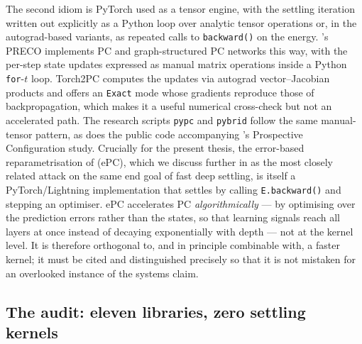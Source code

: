 The second idiom is PyTorch used as a tensor engine, with the settling iteration written
out explicitly as a Python loop over analytic tensor operations or, in the autograd-based
variants, as repeated calls to \texttt{backward()} on the energy. \citet{vanzwol2024preco}'s
PRECO implements PC and graph-structured PC networks this way, with the per-step state
updates expressed as manual matrix operations inside a Python \texttt{for}-$t$ loop.
Torch2PC \citep{vanzwol2024preco} computes the updates via autograd vector--Jacobian
products and offers an \texttt{Exact} mode whose gradients reproduce those of
backpropagation, which makes it a useful numerical cross-check but not an accelerated path.
The research scripts \texttt{pypc} and \texttt{pybrid} follow the same manual-tensor
pattern, as does the public code accompanying \citet{song2024prospective}'s Prospective
Configuration study. Crucially for the present thesis, the error-based reparametrisation of
\citet{goemaere2025epc} (ePC), which we discuss further in
 as the most closely related attack on the same end goal
of fast deep settling, is itself a PyTorch/Lightning implementation that settles by
calling \texttt{E.backward()} and stepping an optimiser. ePC accelerates PC
\emph{algorithmically} --- by optimising over the prediction errors rather than the states,
so that learning signals reach all layers at once instead of decaying exponentially with
depth --- not at the kernel level. It is therefore orthogonal to, and in principle
combinable with, a faster kernel; it must be cited and distinguished precisely so that it
is not mistaken for an overlooked instance of the systems claim.

\subsection{The audit: eleven libraries, zero settling kernels}

